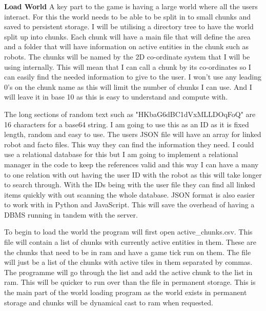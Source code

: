 \documentclass[12pt]{article}
\begin{document}
\textbf{Load World}\newline
A key part to the game is having a large world where all the users interact. For this the world needs to be able to be split in to small chunks and saved to persistent storage. I will be utilising a directory tree to have the world split up into chunks. Each chunk will have a main file that will define the area and a folder that will have information on active entities in the chunk such as robots. The chunks will be named by the 2D co-ordinate system that I will be using internally. This will mean that I can call a chunk by its co-ordinates so I can easily find the needed information to give to the user.
I won't use any leading 0's on the chunk name as this will limit the number of chunks I can use. And I will leave it in base 10 as this is easy to understand and compute with.
\newpage
{}

The long sections of random text such as "HKbaG6dBC1dVxMLLDOqFoQ" are 16 characters for a base64 string. I am going to use this as an ID as it is fixed length, random and easy to use. The users JSON file will have an array for linked robot and facto files. This way they can find the information they need. I could use a relational database for this but I am going to implement a relational manager in the code to keep the references valid and this way I can have a many to one relation with out having the user ID with the robot as this will take longer to search through. With the IDs being with the user file they can find all linked items quickly with out scanning the whole database. JSON format is also easier to work with in Python and JavaScript. This will save the overhead of having a DBMS running in tandem with the server. 

To begin to load the world the program will first open active\_chunks.csv. This file will contain a list of chunks with currently active entities in them. These are the chunks that need to be in ram and have a game tick run on them. The file will just be a list of the chunks with active tiles in them separated by commas. The programme will go through the list and add the active chunk to the list in ram. This will be quicker to run over than the file in permanent storage. This is the main part of the world loading program as the world exists in permanent storage and chunks will be dynamical cast to ram when requested.
\end{document}
